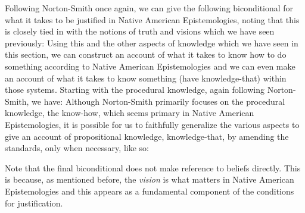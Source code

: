 Following Norton-Smith once again, we can give the following biconditional for what it takes to be justified in Native American Epistemologies, noting that this is closely tied in with the notions of truth and visions which we have seen previously:
Using this and the other aspects of knowledge which we have seen in this section, we can construct an account of what it takes to know how to do something according to Native American Epistemologies and we can even make an account of what it takes to know something (have knowledge-that) within those systems. Starting with the procedural knowledge, again following Norton-Smith, we have:
Although Norton-Smith primarily focuses on the procedural knowledge, the know-how, which seems primary in Native American Epistemologies, it is possible for us to faithfully generalize the various aspects to give an account of propositional knowledge, knowledge-that, by amending the standards, only when necessary, like so:

Note that the final biconditional does not make reference to beliefs directly. This is because, as mentioned before, the \emph{vision} is what matters in Native American Epistemologies and this appears as a fundamental component of the conditions for justification. 
   